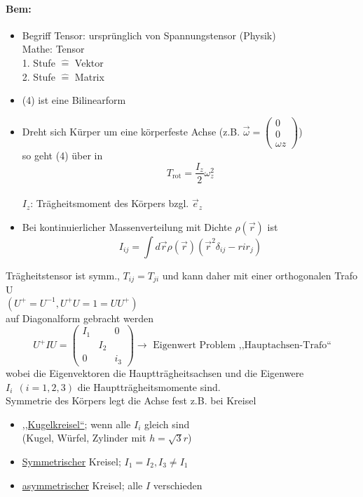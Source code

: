 \documentclass[titlepage,12pt,a4paper,ngerman]{report}
\newcommand{\tx}[1]{\textrm{#1}}
\begin{document}
\paragraph{Bem:}
\begin{itemize}
	\item Begriff Tensor: ursprünglich von Spannungstensor (Physik) \\
	Mathe: Tensor \\
	1. Stufe $ \widehat{=} $ Vektor\\
	2. Stufe $ \widehat{=} $ Matrix
	\item (4) ist eine Bilinearform
	\item Dreht sich Kürper um eine körperfeste Achse (z.B. $ \vec{\omega} = \begin{pmatrix}
	0\\ 0\\ \omega z
	\end{pmatrix} $) \\
	so geht (4) über in
	$$ T_{\tx{rot}} = \frac{I_z}{2} \omega_z^2$$\\
	$ I_z $: Trägheitsmoment des Körpers bzgl. $ \vec{e}_z $
	\item Bei kontinuierlicher Massenverteilung mit Dichte $ \rho(\vec{r}) $ ist 
	$$I_{ij} = \int d \vec{r} \rho(\vec{r}) (\vec{r}^2 \delta_{ij} - rir_j)$$
\end{itemize}
Trägheitstensor ist symm., $ T_{ij} = T_{ji} $ und kann daher mit einer orthogonalen Trafo U\\
$( U^+ = U^{-1}, U^+ U = 1 = U U ^+) $\\
auf Diagonalform gebracht werden
$$U^+ I U = \begin{pmatrix}
I_1& & 0 \\
& I_2 & \\
0 & & i_3
\end{pmatrix} \rightarrow \tx{ Eigenwert Problem ,,Hauptachsen-Trafo``}$$
wobei die Eigenvektoren die Hauptträgheitsachsen und die Eigenwere $ I_i \ \ (i=1,2,3) $ die Hauptträgheitsmomente sind.\\
Symmetrie des Körpers legt die Achse fest z.B. bei Kreisel
\begin{itemize}
	\item \underline{,,Kugelkreisel``}; wenn alle $ I_i $ gleich sind\\
	(Kugel, Würfel, Zylinder mit $ h=\sqrt{3}r $)
	\item \underline{Symmetrischer} Kreisel; $ I_1 = I_2 ,  I_3 \neq I_1 $
	\item \underline{asymmetrischer} Kreisel; alle $I$ verschieden
\end{itemize}
\end{document}
